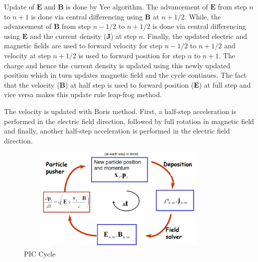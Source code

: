 \documentclass[]{article}
\begin{document}

Update of $\mathbf{E}$ and $\mathbf{B}$ is done by Yee algorithm. The advancement of $\mathbf{E}$ from step $n$ to $n+1$ is done via central differencing using $\mathbf{B}$ at $n+1/2$. While, the advancement of $\mathbf{B}$ from step $n-1/2$ to $n+1/2$ is done via central differencing using $\mathbf{E}$ and the current density ($\textbf{J}$) at step $n$. Finally, the updated electric and magnetic fields are used to forward velocity for step $n-1/2$ to $n+1/2$ and velocity at step $n+1/2$ is used to forward position for step $n$ to $n+1$. The charge and hence the current density is updated using this newly updated position which in turn updates magnetic field and the cycle continues. The fact that the velocity ($\mathbf{B}$) at half step is used to forward position ($\mathbf{E}$) at full step and vice versa makes this update rule leap-frog method.

The velocity is updated with Boris method. First, a half-step acceleration is performed in the electric field direction, followed by full rotation in magnetic field and finally, another half-step acceleration is performed in the electric field direction.
\begin{figure}
    \includegraphics[width=10cm, height=5cm]{PIC.png}
    \centering
    \caption{PIC Cycle}
\end{figure}
\end{document}
